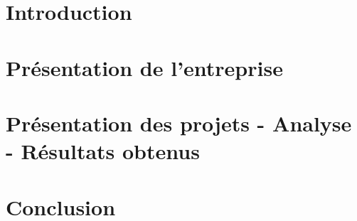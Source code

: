 \documentclass[a4paper, oneside, 12pt, final]{extreport}
\begin{document}

\tableofcontents

\listoffigures


\cleardoublepage

\newpage
{}
\chapter*{Introduction}
\label{chap:general_intorduction}



\chapter{Présentation de l'entreprise}
\label{chap:chapterone}


\chapter{Présentation des projets - Analyse - Résultats obtenus}
\label{chap:2}



\chapter*{Conclusion}
\label{chap:conclusion}


\appendix
\newpage
\renewcommand{\thepage}{\Alph{page}}





\nocite{*}







%



\cleardoublepage%


\end{document}

